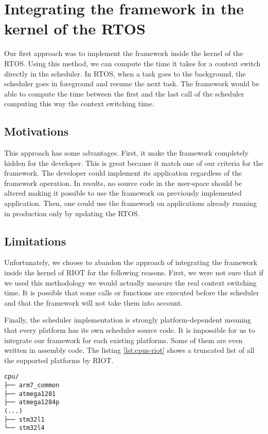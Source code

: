 \section{Integrating the framework in the kernel of the RTOS \label{sec:kernel}}

Our first approach was to implement the framework inside the kernel of the RTOS.
Using this method, we can compute the time it takes for a context switch directly in the scheduler.
In RTOS, when a task goes to the background, the scheduler goes in foreground and resume the next task.
The framework would be able to compute the time between the first and the last call of the scheduler computing this way the context switching time.

\subsection{Motivations}

This approach has some advantages.
First, it make the framework completely hidden for the developer.
This is great because it match one of our criteria for the framework.
The developer could implement its application regardless of the framework operation.
In results, no source code in the user-space should be altered making it possible to use the framework on previously implemented application.
Then, one could use the framework on applications already running in production only by updating the RTOS.

\subsection{Limitations}

Unfortunately, we choose to abandon the approach of integrating the framework inside the kernel of RIOT for the following reasons.
First, we were not sure that if we used this methodology we would actually measure the real context switching time.
It is possible that some calls or functions are executed before the scheduler and that the framework will not take them into account.

Finally, the scheduler implementation is strongly platform-dependent meaning that every platform has its own scheduler source code.
It is impossible for us to integrate our framework for each existing platforms.
Some of them are even written in assembly code.
The listing \ref{lst:cpus-riot} shows a truncated list of all the supported platforms by RIOT.

\begin{lstlisting}[style=ascii-tree, label={lst:cpus-riot}, caption={Truncated list of platforms supported by RIOT}]
cpu/
├── arm7_common
├── atmega1281
├── atmega1284p
(...)
├── stm32l1
└── stm32l4
\end{lstlisting}